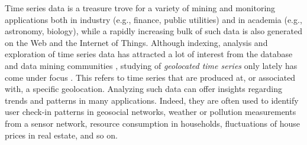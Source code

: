
Time series data is a treasure trove for a variety of mining and monitoring applications both in industry (e.g., finance, public utilities) and in academia (e.g., astronomy, biology), while a rapidly increasing bulk of such data is also generated on the Web and the Internet of Things. Although indexing, analysis and exploration of time series data has attracted a lot of interest from the database and data mining communities \cite{camerra2014kais,ding2008pvldb,shieh2008kdd}, studying of {\em geolocated time series} only lately has come under focus \cite{chatzig17btsr}. This refers to time series that are produced at, or associated with, a specific geolocation. Analyzing such data can offer insights regarding trends and patterns in many applications. Indeed, they are often used to identify user check-in patterns in geosocial networks, weather or pollution measurements from a sensor network, resource consumption in households, fluctuations of house prices in real estate, and so on.

